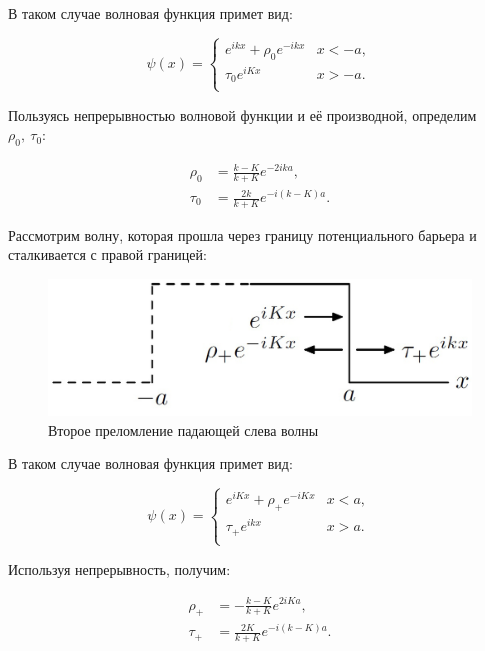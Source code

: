 \documentclass[a4 paper, 12 pt]{extarticle}
\begin{document}
   В таком случае волновая функция примет вид:
   
   \begin{equation*}
   \psi(x)=\left\{%
   \begin{array}{ll}
   e^{ikx}+\rho_0e^{-ikx} & x<-a, \\
   \tau_0 e^{iKx} & x>-a. \\
   \end{array}%
   \right.
   \end{equation*}

   Пользуясь непрерывностью волновой функции и её производной, определим $\rho_0, \ \tau_0$:

   \[
   \begin{aligned}
   \rho_0&=\frac{k-K}{k+K}e^{-2ika},\\
   \tau_0&=\frac{2k}{k+K}e^{-i(k-K)a}.
   \end{aligned}\]
   
   Рассмотрим волну, которая прошла через границу потенциального барьера и сталкивается с правой границей:
   
   \begin{figure}[!htb]
   	\centering
   	\includegraphics[scale=0.25]{reflect2.jpg}
   	\caption{Второе преломление падающей слева волны}
   \end{figure}

   В таком случае волновая функция примет вид:
   
   \[
   \psi(x)=\left\{%
   \begin{array}{ll}
   e^{iKx}+\rho_+e^{-iKx} & x<a, \\
   \tau_+e^{ikx} & x>a. \\
   \end{array}%
   \right.
   \]
   
   Используя непрерывность, получим:
   
   \[
   \begin{aligned}
   \rho_+&=-\frac{k-K}{k+K}e^{2iKa},\\
   \tau_+&=\frac{2K}{k+K}e^{-i(k-K)a}.
   \end{aligned}
   \]
   
\end{document}
